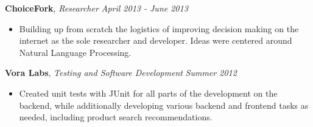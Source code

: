 \documentclass[9pt]{article}
\newenvironment{changemargin}[2]{%
  \begin{list}{}{%
    \setlength{\topsep}{0pt}%
    \setlength{\leftmargin}{#1}%
    \setlength{\rightmargin}{#2}%
    \setlength{\listparindent}{\parindent}%
    \setlength{\itemindent}{\parindent}%
    \setlength{\parsep}{\parskip}%
  }%
  \item[]}{\end{list}
}
\newenvironment{body} {
	\vspace*{-16pt}
	\begin{changemargin}{-0.25in}{-0.5in}
  }	
	{\end{changemargin}
}
\begin{document}
\begin{body}
\begin{itemize}
	\end{itemize}
	\vspace*{-3pt}
	\textbf{ChoiceFork}, \emph{Researcher} \hfill \emph{April 2013 - June 2013}\\
	\vspace*{-4pt}
	\begin{itemize} \itemsep -0pt  %
		\item Building up from scratch the logistics of improving decision making on the internet as the sole researcher and developer. Ideas were centered around Natural Language Processing.
	\end{itemize}
\smallskip
	\vspace*{-5pt}
	\textbf{Vora Labs}, \emph{Testing and Software Development} \hfill \emph{Summer 2012}\\
	\vspace*{-5pt}
	\begin{itemize} \itemsep -0pt  %
		\item Created unit tests with JUnit for all parts of the development on the backend, while additionally developing various backend and frontend tasks as needed, including product search recommendations.
	\end{itemize}
	\vspace*{-3pt}
\smallskip

	
\end{body}

\end{document}
